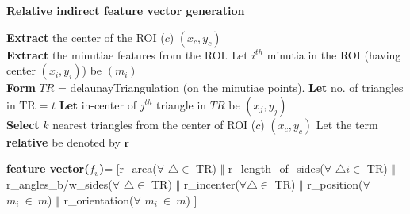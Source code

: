 \begin{algorithm}
	\DontPrintSemicolon 
	\SetAlgoLined 
	\SetAlgoVlined 
	\LinesNumbered 
	\caption{\textbf{Relative indirect feature vector generation}}
	\label{algo1}
	\textbf{Extract} the center of the ROI ($c$) $(x_{c},y_{c})$  \\
	\textbf{Extract} the minutiae features from the ROI. Let $i^{th}$ minutia in
	the ROI (having center $(x_{i},y_{i})$) be $(m_{i})$ \\
	\textbf{Form} $TR$ = delaunayTriangulation (on the minutiae points).\linebreak
	\textbf{Let} no. of triangles in TR = $t$
	\linebreak
	\textbf{Let} in-center of $j^{th}$ triangle in $TR$ be $(x_{j},y_{j})$  \\
	 \textbf{Select} $k$ nearest triangles from the center of ROI ($c$)
	$(x_{c},y_{c})$  \linebreak
	Let the term \textbf{relative} be denoted by $\textbf{r}$\\

	\textbf{ feature vector($f_{v}$)}=   [r\_area($\forall$ $\triangle \in$
	TR) $\mathbin\Vert$ r\_length\_of\_sides($\forall$ $\triangle{i} \in$
	TR) $\mathbin\Vert$ r\_angles\_b/w\_sides($\forall$ $\triangle \in$ TR)
	$\mathbin\Vert$ r\_incenter($\forall \triangle \in$ TR) $\mathbin\Vert$
	r\_position($\forall$ $m_{i}~\in~ m$) $\mathbin\Vert$
	r\_orientation($\forall$ $m_{i}~ \in ~m$) ]
\end{algorithm}
